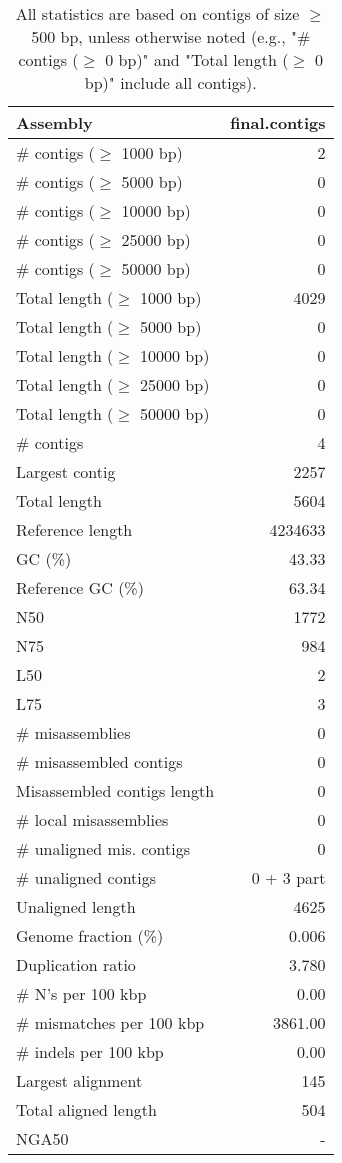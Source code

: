 \documentclass[12pt,a4paper]{article}
\begin{document}
\begin{table}[ht]
\begin{center}
\caption{All statistics are based on contigs of size $\geq$ 500 bp, unless otherwise noted (e.g., "\# contigs ($\geq$ 0 bp)" and "Total length ($\geq$ 0 bp)" include all contigs).}
\begin{tabular}{|l*{1}{|r}|}
\hline
Assembly & final.contigs \\ \hline
\# contigs ($\geq$ 1000 bp) & 2 \\ \hline
\# contigs ($\geq$ 5000 bp) & 0 \\ \hline
\# contigs ($\geq$ 10000 bp) & 0 \\ \hline
\# contigs ($\geq$ 25000 bp) & 0 \\ \hline
\# contigs ($\geq$ 50000 bp) & 0 \\ \hline
Total length ($\geq$ 1000 bp) & 4029 \\ \hline
Total length ($\geq$ 5000 bp) & 0 \\ \hline
Total length ($\geq$ 10000 bp) & 0 \\ \hline
Total length ($\geq$ 25000 bp) & 0 \\ \hline
Total length ($\geq$ 50000 bp) & 0 \\ \hline
\# contigs & 4 \\ \hline
Largest contig & 2257 \\ \hline
Total length & 5604 \\ \hline
Reference length & 4234633 \\ \hline
GC (\%) & 43.33 \\ \hline
Reference GC (\%) & 63.34 \\ \hline
N50 & 1772 \\ \hline
N75 & 984 \\ \hline
L50 & 2 \\ \hline
L75 & 3 \\ \hline
\# misassemblies & 0 \\ \hline
\# misassembled contigs & 0 \\ \hline
Misassembled contigs length & 0 \\ \hline
\# local misassemblies & 0 \\ \hline
\# unaligned mis. contigs & 0 \\ \hline
\# unaligned contigs & 0 + 3 part \\ \hline
Unaligned length & 4625 \\ \hline
Genome fraction (\%) & 0.006 \\ \hline
Duplication ratio & 3.780 \\ \hline
\# N's per 100 kbp & 0.00 \\ \hline
\# mismatches per 100 kbp & 3861.00 \\ \hline
\# indels per 100 kbp & 0.00 \\ \hline
Largest alignment & 145 \\ \hline
Total aligned length & 504 \\ \hline
NGA50 & - \\ \hline
\end{tabular}
\end{center}
\end{table}
\end{document}

